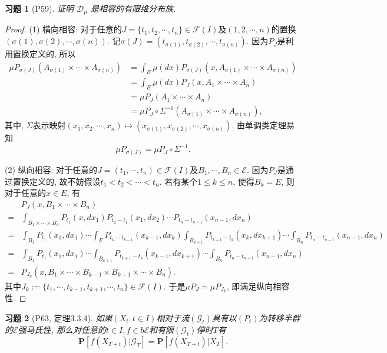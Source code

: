 \documentclass[UTF8,ondside]{ctexart}
\newtheorem{exercise}{习题}[section]
\newcommand{\h}{\mathscr}
\newcommand{\mbf}{\mathbf}
\numberwithin{equation}{section}
\begin{document}
	\begin{exercise}[P59]
		证明 $\h D_\mu$ 是相容的有限维分布族.
	\end{exercise}
	\begin{proof}
		(1) 横向相容: 对于任意的$J=\{t_1,t_2,\cdots,t_n\}\in \h F(I)$及$(1,2,\cdots,n)$的置换$(\sigma(1),\sigma(2),\cdots,\sigma(n))$. 记$\sigma(J)=(t_{\sigma(1)},t_{\sigma(2)},\cdots,t_{\sigma(n)})$. 因为$P_J$是利用置换定义的, 所以
		\[\begin{aligned}
			\mu P_{\sigma(J)}(A_{\sigma(1)}\times\cdots\times A_{\sigma(n)})&=\int_E \mu(dx)P_{\sigma(J)}(x,A_{\sigma(1)}\times\cdots\times A_{\sigma(n)})\\
			&=\int_E \mu(dx)P_J(x,A_1\times\cdots\times A_n)\\
			&=\mu P_J(A_1\times\cdots\times A_n)\\
			&=\mu P_J\circ \Sigma^{-1}(A_{\sigma(1)}\times\cdots\times A_{\sigma(n)}),
		\end{aligned}
		\]
		其中, $\Sigma$表示映射$(x_1,x_2,\cdots,x_n)\mapsto (x_{\sigma(1)},x_{\sigma(2)},\cdots,x_{\sigma(n)})$. 由单调类定理易知
		\[
			\mu P_{\sigma(J)}=\mu P_J\circ \Sigma^{-1}.
		\]

		(2) 纵向相容: 对于任意的$J=(t_1,\cdots,t_n)\in\h F(I)$及$B_1,\cdots,B_n\in\h E$. 因为$P_J$是通过置换定义的, 故不妨假设$t_1<t_2<\cdots <t_n$. 若有某个$1\leq k\leq n$, 使得$B_k=E$, 则对于任意的$x\in E$, 有
		\[
			\begin{aligned}
				&P_J(x,B_1\times\cdots\times B_n)\\
				=&\int_{B_1\times\cdots\times B_n}P_{t_1}(x,dx_1)P_{t_2-t_1}(x_1,dx_2)\cdots P_{t_n-t_{n-1}}(x_{n-1},dx_n)\\
				=&\int_{B_1} P_{t_1}(x_1,dx_1)\cdots\int_E P_{t_k-t_{k-1}}(x_{k-1},dx_k)\int_{B_{k+1}} P_{t_{k+1}-t_k}(x_k,dx_{k+1})\cdots\int_{B_n}P_{t_n-t_{n-1}}(x_{n-1},dx_n)\\
				=&\int_{B_1} P_{t_1}(x_1,dx_1)\cdots\int_{B_{k+1}} P_{t_{k+1}-t_k}(x_{k-1},dx_{k+1})\cdots\int_{B_n}P_{t_n-t_{n-1}}(x_{n-1},dx_n)\\
				=&P_{J_k}(x,B_1\times\cdots\times B_{k-1}\times B_{k+1}\times\cdots\times B_n).
			\end{aligned}
		\]
		其中$J_k:=\{t_1,\cdots,t_{k-1},t_{k+1},\cdots,t_n\}\in\h F(I)$. 于是$\mu P_J=\mu P_{J_k}$, 即满足纵向相容性.
	\end{proof}
	\begin{exercise}[P63, 定理3.3.4]
		如果$(X_t:t\in I)$相对于流$(\h G_t)$具有以$(P_t)$为转移半群的$\h E$强马氏性, 那么对任意的$t\in I,f\in b\h E$和有限$(\h G_t)$停时$T$有
		\[
			\mbf P[f(X_{T+t})|\h G_T]=\mbf P[f(X_{T+t})|X_T].
		\]
	\end{exercise}
\end{document}

